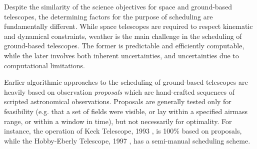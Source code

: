 \documentclass[12pt]{aastex62}
\theoremstyle{definition}
\begin{document}
Despite the similarity of the science objectives for space and ground-based telescopes, the determining factors for the purpose of scheduling are fundamentally different. While space telescopes are required to respect kinematic and dynamical constraints, weather is the main challenge in the scheduling of ground-based telescopes. The former is predictable and efficiently computable, while the later involves both inherent uncertainties, and uncertainties due to computational limitations.

Earlier algorithmic approaches to the scheduling of ground-based telescopes are heavily based on observation \textit{proposals} which are hand-crafted sequences of scripted astronomical observations. Proposals are generally tested only for feasibility (e.g. that a set of fields were visible, or lay within a specified airmass range, or within a window in time), but not necessarily for optimality. For instance, the operation of Keck Telescope, 1993 \citep{nelson1985design}, is 100\% based on proposals, while the Hobby-Eberly Telescope, 1997 \citep{shetrone2007ten}, has a semi-manual scheduling scheme.
\end{document}
